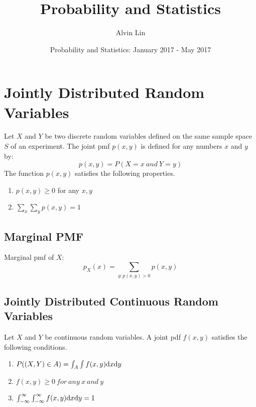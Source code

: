 \documentclass[letterpaper, 12pt]{math}
\title{Probability and Statistics}
\author{Alvin Lin}
\date{Probability and Statistics: January 2017 - May 2017}
\begin{document}
\maketitle

\section*{Jointly Distributed Random Variables}
Let \( X \) and \( Y \) be two discrete random variables defined on the same
sample space \( S \) of an experiment. The joint pmf \( p(x,y) \) is defined
for any numbers \( x \) and \( y \) by:
\[ p(x,y) = P(X=x\ and\ Y=y) \]
The function \( p(x,y) \) satisfies the following properties.
\begin{enumerate}
  \item \( p(x,y) \geq 0 \) for any \( x,y \) \\
  \item \( \sum_{x}\sum_{y}p(x,y) = 1 \) \\
\end{enumerate}

\subsection*{Marginal PMF}
Marginal pmf of \( X \):
\[ p_{X}(x) = \sum_{y:p(x,y)>0}p(x,y) \]

\subsection*{Jointly Distributed Continuous Random Variables}
Let \( X \) and \( Y \) be continuous random variables. A joint pdf \( f(x,y) \)
satisfies the following conditions.
\begin{enumerate}
  \item \( P((X,Y)\in A) = \int_{A}\int f(x,y)\mathrm{d}{x}\mathrm{d}{y} \)
  \item \( f(x,y)\geq 0\ for\ any\ x\ and\ y \) \\
  \item \( \int_{-\infty}^{\infty}\int_{-\infty}^{\infty}
    f(x,y)\mathrm{d}{x}\mathrm{d}{y} = 1 \)
\end{enumerate}
\end{document}
